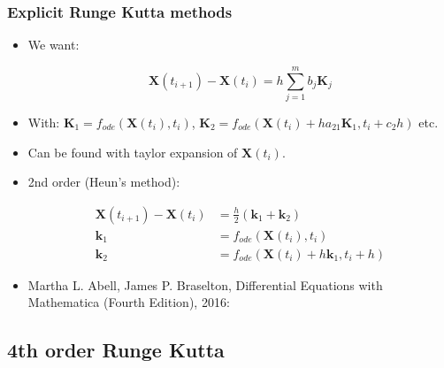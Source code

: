 \documentclass{beamer}
\begin{document}
\begin{frame}
\frametitle{Explicit Runge Kutta methods}
\begin{itemize}

\item<1-> We want:

\begin{equation*}
\mathbf{X}(t_{i+1})-\mathbf{X}(t_{i}) =  h \sum_{j=1}^{m} b_j \mathbf{K}_j
\end{equation*}

\item<1-> With: $\mathbf{K}_1 =  f_{ode}(\mathbf{X}(t_i),t_i)$, $\mathbf{K}_2 =  f_{ode}(\mathbf{X}(t_i)+ha_{21}\mathbf{K}_{1},t_i+c_2h)$ etc.

\item<2-> Can be found with taylor expansion of $\mathbf{X}(t_{i})$.

\item<3-> 2nd order (Heun's method):

\begin{align*}
\mathbf{X}(t_{i+1})-\mathbf{X}(t_{i}) &= \frac{h}{2}(\mathbf{k}_1+\mathbf{k}_2)\\
\mathbf{k}_1 &= f_{ode}(\mathbf{X}(t_i),t_i)\\
\mathbf{k}_2 &= f_{ode}(\mathbf{X}(t_i)+h\mathbf{k}_1,t_i+h)
\end{align*}

\item<1-> {{\color{gray} Martha L. Abell, James P. Braselton, Differential Equations with Mathematica (Fourth Edition), 2016}}:
\end{itemize}
\end{frame}


\subsection{4th order Runge Kutta}
\end{document}
